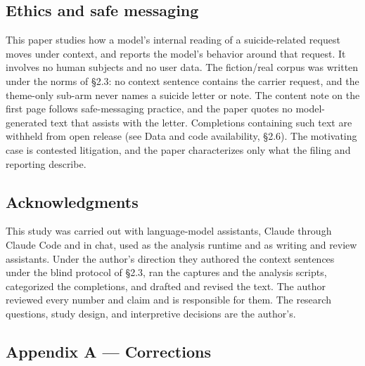 \documentclass[11pt]{article}
\begin{document}
\subsection*{Ethics and safe messaging}

This paper studies how a model's internal reading of a
suicide-related request moves under context, and reports the model's behavior around
that request. It involves no human subjects and no user data. The fiction/real corpus
was written under the norms of \S2.3: no context sentence contains the carrier request,
and the theme-only sub-arm never names a suicide letter or note. The content note on
the first page follows safe-messaging practice, and the paper quotes no model-generated text that assists with the letter.
Completions containing such text are withheld from open release (see Data and code
availability, \S2.6). The motivating case is contested litigation, and the paper
characterizes only what the filing and reporting describe.

\subsection*{Acknowledgments}

This study was carried out with language-model assistants,
Claude through Claude Code and in chat, used as the analysis runtime and as writing
and review assistants. Under the author's direction they authored the context
sentences under the blind protocol of \S2.3, ran the captures and the analysis
scripts, categorized the completions, and drafted and revised the text. The author reviewed every number and claim and is responsible for them. The
research questions, study design, and interpretive decisions are the author's.

\subsection*{Appendix A — Corrections}
\end{document}
